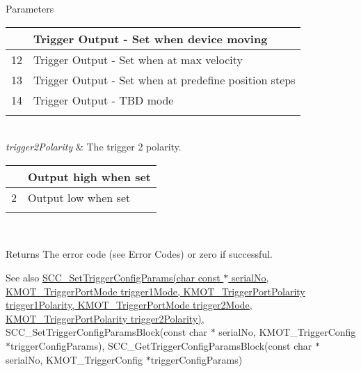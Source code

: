 \begin{DoxyParams}{Parameters}
\begin{tabularx}{\linewidth}{|*{2}{>{\raggedright\arraybackslash}X|}}
11&Trigger Output -\/ Set when device moving \\\cline{1-2}
12&Trigger Output -\/ Set when at max velocity \\\cline{1-2}
13&Trigger Output -\/ Set when at predefine position steps \\\cline{1-2}
14&Trigger Output -\/ T\+BD mode \\\cline{1-2}
\end{tabularx}
\\
\hline
{\em trigger2\+Polarity} & The trigger 2 polarity.\begin{tabularx}{\linewidth}{|*{2}{>{\raggedright\arraybackslash}X|}}\hline
1&Output high when set \\\cline{1-2}
2&Output low when set \\\cline{1-2}
\end{tabularx}
\\
\hline
\end{DoxyParams}
\begin{DoxyReturn}{Returns}
The error code (see Error Codes) or zero if successful. 
\end{DoxyReturn}
\begin{DoxySeeAlso}{See also}
\hyperlink{group___k_cube_stepper_ga6768c8cc6f6206d28c62ed80ba6ec795}{S\+C\+C\+\_\+\+Set\+Trigger\+Config\+Params(char const $\ast$ serial\+No, K\+M\+O\+T\+\_\+\+Trigger\+Port\+Mode trigger1\+Mode, K\+M\+O\+T\+\_\+\+Trigger\+Port\+Polarity trigger1\+Polarity, K\+M\+O\+T\+\_\+\+Trigger\+Port\+Mode trigger2\+Mode, K\+M\+O\+T\+\_\+\+Trigger\+Port\+Polarity trigger2\+Polarity)}, S\+C\+C\+\_\+\+Set\+Trigger\+Config\+Params\+Block(const char $\ast$ serial\+No, K\+M\+O\+T\+\_\+\+Trigger\+Config $\ast$trigger\+Config\+Params), S\+C\+C\+\_\+\+Get\+Trigger\+Config\+Params\+Block(const char $\ast$ serial\+No, K\+M\+O\+T\+\_\+\+Trigger\+Config $\ast$trigger\+Config\+Params)


\end{DoxySeeAlso}
